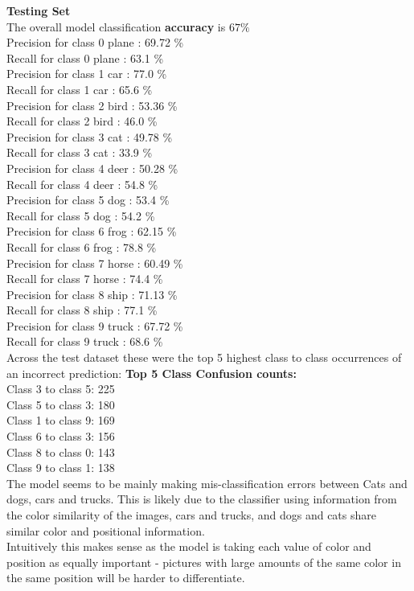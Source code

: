 \documentclass[submit]{harvardml}
\begin{document}
\begin{enumerate}
    \textbf{Testing Set} \\
    The overall model classification \textbf{accuracy} is $67\%$\\
    Precision for class 0 plane : 69.72 \% \\
    Recall for class 0 plane : 63.1 \% \\
    Precision for class 1 car : 77.0 \% \\
    Recall for class 1 car : 65.6 \% \\
    Precision for class 2 bird : 53.36 \% \\
    Recall for class 2 bird : 46.0 \% \\
    Precision for class 3 cat : 49.78 \% \\
    Recall for class 3 cat : 33.9 \% \\
    Precision for class 4 deer : 50.28 \% \\
    Recall for class 4 deer : 54.8 \% \\
    Precision for class 5 dog : 53.4 \% \\
    Recall for class 5 dog : 54.2 \% \\
    Precision for class 6 frog : 62.15 \% \\
    Recall for class 6 frog : 78.8 \% \\
    Precision for class 7 horse : 60.49 \% \\
    Recall for class 7 horse : 74.4 \% \\
    Precision for class 8 ship : 71.13 \% \\
    Recall for class 8 ship : 77.1 \% \\
    Precision for class 9 truck : 67.72 \% \\
    Recall for class 9 truck : 68.6 \% \\
    
    Across the test dataset these were the top 5 highest class to class occurrences of an incorrect prediction:
    \textbf{Top 5 Class Confusion counts:}\\
    Class 3 to class 5: 225 \\
    Class 5 to class 3: 180 \\
    Class 1 to class 9: 169 \\
    Class 6 to class 3: 156 \\
    Class 8 to class 0: 143 \\
    Class 9 to class 1: 138 \\

    The model seems to be mainly making mis-classification errors between Cats and dogs, cars and trucks. This is likely due to the classifier using information from the color similarity of the images, cars and trucks, and dogs and cats share similar color and positional information.\\
    Intuitively this makes sense as the model is taking each value of color and position as equally important - pictures with large amounts of the same color in the same position will be harder to differentiate.
    

\end{enumerate}
\end{document}
